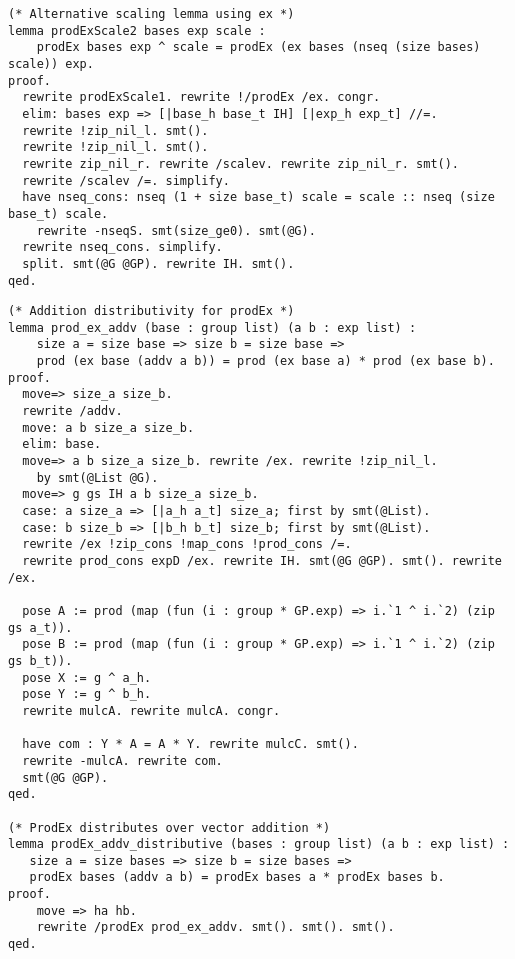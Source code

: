\begin{lstlisting}[style=easycrypt, caption=Proof of Scaling Consistency (Alternative), breaklines=true, breakatwhitespace=true, frame=single, keepspaces=true]
(* Alternative scaling lemma using ex *)
lemma prodExScale2 bases exp scale :
    prodEx bases exp ^ scale = prodEx (ex bases (nseq (size bases) scale)) exp.
proof.
  rewrite prodExScale1. rewrite !/prodEx /ex. congr.
  elim: bases exp => [|base_h base_t IH] [|exp_h exp_t] //=.
  rewrite !zip_nil_l. smt(). 
  rewrite !zip_nil_l. smt(). 
  rewrite zip_nil_r. rewrite /scalev. rewrite zip_nil_r. smt(). 
  rewrite /scalev /=. simplify.
  have nseq_cons: nseq (1 + size base_t) scale = scale :: nseq (size base_t) scale. 
    rewrite -nseqS. smt(size_ge0). smt(@G). 
  rewrite nseq_cons. simplify.
  split. smt(@G @GP). rewrite IH. smt().
qed.
\end{lstlisting}
\begin{lstlisting}[style=easycrypt, caption=Proof of Linear Distributivity, breaklines=true, breakatwhitespace=true, frame=single, keepspaces=true]
(* Addition distributivity for prodEx *)
lemma prod_ex_addv (base : group list) (a b : exp list) :
    size a = size base => size b = size base =>
    prod (ex base (addv a b)) = prod (ex base a) * prod (ex base b).
proof.
  move=> size_a size_b.
  rewrite /addv.
  move: a b size_a size_b.
  elim: base.
  move=> a b size_a size_b. rewrite /ex. rewrite !zip_nil_l.
    by smt(@List @G). 
  move=> g gs IH a b size_a size_b.
  case: a size_a => [|a_h a_t] size_a; first by smt(@List).
  case: b size_b => [|b_h b_t] size_b; first by smt(@List). 
  rewrite /ex !zip_cons !map_cons !prod_cons /=. 
  rewrite prod_cons expD /ex. rewrite IH. smt(@G @GP). smt(). rewrite /ex. 

  pose A := prod (map (fun (i : group * GP.exp) => i.`1 ^ i.`2) (zip gs a_t)).
  pose B := prod (map (fun (i : group * GP.exp) => i.`1 ^ i.`2) (zip gs b_t)).
  pose X := g ^ a_h.
  pose Y := g ^ b_h. 
  rewrite mulcA. rewrite mulcA. congr.

  have com : Y * A = A * Y. rewrite mulcC. smt(). 
  rewrite -mulcA. rewrite com. 
  smt(@G @GP). 
qed.

(* ProdEx distributes over vector addition *)
lemma prodEx_addv_distributive (bases : group list) (a b : exp list) :
   size a = size bases => size b = size bases =>
   prodEx bases (addv a b) = prodEx bases a * prodEx bases b.
proof.
    move => ha hb.
    rewrite /prodEx prod_ex_addv. smt(). smt(). smt().
qed.
\end{lstlisting}

